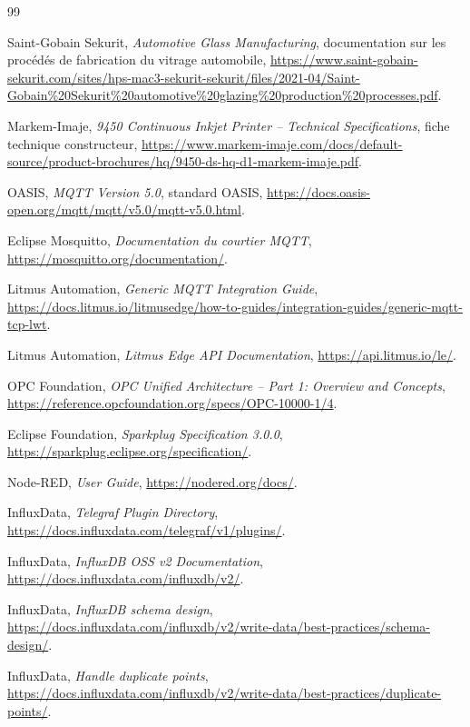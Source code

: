 \documentclass[12pt,a4paper,oneside]{report}
\begin{document}
\begin{thebibliography}{99}

Saint-Gobain Sekurit, \emph{Automotive Glass Manufacturing}, documentation
sur les procédés de fabrication du vitrage automobile,
\url{https://www.saint-gobain-sekurit.com/sites/hps-mac3-sekurit-sekurit/files/2021-04/Saint-Gobain\%20Sekurit\%20automotive\%20glazing\%20production\%20processes.pdf}.

Markem-Imaje, \emph{9450 Continuous Inkjet Printer -- Technical
Specifications}, fiche technique constructeur,
\url{https://www.markem-imaje.com/docs/default-source/product-brochures/hq/9450-ds-hq-d1-markem-imaje.pdf}.

OASIS, \emph{MQTT Version 5.0}, standard OASIS,
\url{https://docs.oasis-open.org/mqtt/mqtt/v5.0/mqtt-v5.0.html}.

Eclipse Mosquitto, \emph{Documentation du courtier MQTT},
\url{https://mosquitto.org/documentation/}.

Litmus Automation, \emph{Generic MQTT Integration Guide},
\url{https://docs.litmus.io/litmusedge/how-to-guides/integration-guides/generic-mqtt-tcp-lwt}.

Litmus Automation, \emph{Litmus Edge API Documentation},
\url{https://api.litmus.io/le/}.

OPC Foundation, \emph{OPC Unified Architecture -- Part 1: Overview and
Concepts},
\url{https://reference.opcfoundation.org/specs/OPC-10000-1/4}.

Eclipse Foundation, \emph{Sparkplug Specification 3.0.0},
\url{https://sparkplug.eclipse.org/specification/}.

Node-RED, \emph{User Guide},
\url{https://nodered.org/docs/}.

InfluxData, \emph{Telegraf Plugin Directory},
\url{https://docs.influxdata.com/telegraf/v1/plugins/}.

InfluxData, \emph{InfluxDB OSS v2 Documentation},
\url{https://docs.influxdata.com/influxdb/v2/}.

InfluxData, \emph{InfluxDB schema design},
\url{https://docs.influxdata.com/influxdb/v2/write-data/best-practices/schema-design/}.

InfluxData, \emph{Handle duplicate points},
\url{https://docs.influxdata.com/influxdb/v2/write-data/best-practices/duplicate-points/}.


\end{thebibliography}
\end{document}
